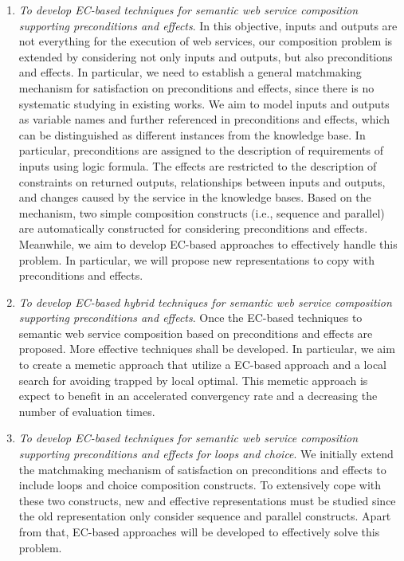 \begin{enumerate}
\begin{enumerate}
  \item \emph{To develop EC-based techniques for semantic web service composition supporting preconditions and effects}. In this objective, inputs and outputs are not everything for the execution of web services, our composition problem is extended by considering not only inputs and outputs, but also preconditions and effects. In particular, we need to establish a general matchmaking mechanism for satisfaction on preconditions and effects, since there is no systematic studying in existing works. We aim to model inputs and outputs as variable names and further referenced in preconditions and effects, which can be distinguished as different instances from the knowledge base. In particular, preconditions are assigned to the description of requirements of inputs using logic formula. The effects are restricted to the description of constraints on returned outputs, relationships between inputs and outputs, and changes caused by the service in the knowledge bases. Based on the mechanism, two simple composition constructs (i.e., sequence and parallel) are automatically constructed for considering preconditions and effects. Meanwhile, we aim to develop EC-based approaches to effectively handle this problem. In particular, we will propose new representations to copy with preconditions and effects.

  \item \emph{To develop EC-based hybrid techniques for semantic web service composition supporting preconditions and effects}. Once the EC-based techniques to semantic web service composition based on preconditions and effects are proposed. More effective techniques shall be developed. In particular, we aim to create a memetic approach that utilize a EC-based approach and a local search for avoiding trapped by local optimal. This memetic approach is expect to benefit in an accelerated convergency rate and a decreasing the number of evaluation times.
    
   \item \emph{To develop EC-based techniques for semantic web service composition supporting preconditions and effects for loops and choice}. We initially extend the matchmaking mechanism of satisfaction on preconditions and effects to include loops and choice composition constructs. To extensively cope with these two constructs, new and effective representations must be studied since the old representation only consider sequence and parallel constructs. Apart from that, EC-based approaches will be developed to effectively solve this problem.

 
 \end{enumerate}
 
\end{enumerate}

